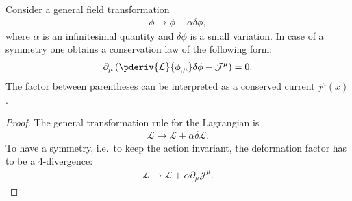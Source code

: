     \begin{theorem}\label{field:noethers_theorem}
        Consider a general field transformation
        \begin{gather}
            \phi\longrightarrow\phi+\alpha\delta\phi,
        \end{gather}
        where $\alpha$ is an infinitesimal quantity and $\delta\phi$ is a small variation. In case of a symmetry one obtains a conservation law of the following form:
        \begin{gather}
            \label{field:conserved_current}
            \partial_\mu\left(\pderiv{\mathcal{L}}{\phi_{,\mu}}\delta\phi - \mathcal{J}^\mu\right) = 0.
        \end{gather}
        The factor between parentheses can be interpreted as a conserved current $j^\mu(x)$.
        \begin{mdframed}[roundcorner=10pt, linecolor=blue, linewidth=1pt]
            \begin{proof}
                The general transformation rule for the Lagrangian is
                \begin{gather}
                    \label{noether_deriv:1}
                    \mathcal{L}\longrightarrow\mathcal{L} + \alpha\delta\mathcal{L}.
                \end{gather}
                To have a symmetry, i.e.~to keep the action invariant, the deformation factor has to be a 4-divergence:
                \begin{gather}
                    \label{noether_deriv:2}
                    \mathcal{L}\longrightarrow\mathcal{L} + \alpha\partial_\mu\mathcal{J}^\mu.
                \end{gather}


\end{proof}
\end{mdframed}
\end{theorem}
